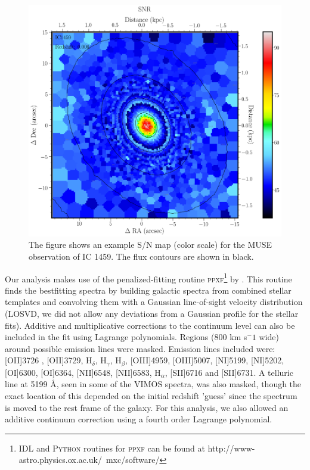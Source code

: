 		\begin{figure}
			\centering
			\includegraphics[width=.6\textwidth]{chapter2/egSNR.png}
			\caption[Example S/N map]{The figure shows an example S/N map (color scale) for the MUSE observation of IC 1459. The flux contours are shown in black.}
			\label{fig:MassRe}
		\end{figure}

		Our analysis makes use of the penalized-fitting routine \textsc{ppxf}\footnote{\textsc{IDL} and \textsc{Python} routines for \textsc{ppxf} can be found at http://www-astro.physics.ox.ac.uk/~mxc/software/} by \citet{Cappellari2004, Cappellari2016a}. This routine finds the bestfitting spectra by building galactic spectra from combined stellar templates and convolving them with a Gaussian line-of-sight velocity distribution (LOSVD, we did not allow any deviations from a Gaussian profile for the stellar fits). Additive and multiplicative corrections to the continuum level can also be included in the fit using Lagrange polynomials. Regions (800 km s$^-1$ wide) around possible emission lines were masked. Emission lines included were: [OII]3726 , [OII]3729, H$_\delta$, H$_\gamma$, H$_\beta$, [OIII]4959, [OIII]5007, [NI]5199, [NI]5202, [OI]6300, [OI]6364, [NII]6548, [NII]6583, H$_\alpha$, [SII]6716 and [SII]6731. A telluric line at 5199 \AA, seen in some of the VIMOS spectra, was also masked, though the exact location of this depended on the initial redshift 'guess' since the spectrum is moved to the rest frame of the galaxy. For this analysis, we also allowed an additive continuum correction using a fourth order Lagrange polynomial.

